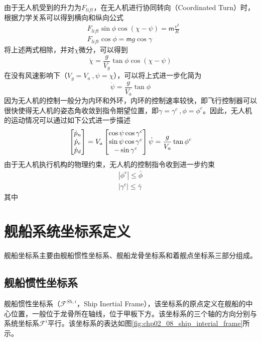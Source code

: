 由于无人机受到的升力为$F_{lift}$，在无人机进行协同转向（Coordinated Turn）时，根据力学关系可以得到横向和纵向公式
\begin{align}
&F_{lift} \sin \phi \cos (\chi - \psi) = \mathsf{m} \frac{v^2}{R}  \\
&F_{lift } \cos \phi = \mathsf{m} g \cos \gamma
\end{align}
将上述两式相除，并对$\chi$微分，可以得到
\begin{equation}
\dot{\chi} = \frac{g}{V_g} \tan \phi \cos (\chi - \psi)
\end{equation}
在没有风速影响下（$V_g = V_a\ , \psi = \chi$），可以将上式进一步化简为
\begin{equation}
\dot{\psi} =\frac{g}{V_a} \tan \phi
\end{equation}
因为无人机的控制一般分为内环和外环，内环的控制速率较快，即飞行控制器可以很快使得无人机的姿态角收敛到指令期望位置，即$\gamma = \gamma^c\ , \phi = \phi^c$。因此，无人机的运动情况可以通过如下公式进一步描述
\begin{equation}
\begin{bmatrix} \dot{p}_n \\\dot{p}_e \\ \dot{p}_d \end{bmatrix}  = {V}_a \begin{bmatrix} \cos \psi \cos \gamma^c \\ \sin \psi \cos \gamma^c  \\- \sin \gamma^c \end{bmatrix} \\
\dot{\psi} =\frac{g}{V_a} \tan \phi^c
\end{equation}
由于无人机执行机构的物理约束，无人机的控制指令收到进一步约束
\begin{align}
|\phi^c| \le \bar{\phi} \\
|\gamma^c| \le \bar{\gamma}
\end{align}
其中


\section{舰船系统坐标系定义}

舰船坐标系主要由舰船惯性坐标系、舰船龙骨坐标系和着舰点坐标系三部分组成。
\subsection{舰船惯性坐标系}
舰船惯性坐标系（$\mathcal{F}^{Sh,i}$，Ship Inertial Frame），该坐标系的原点定义在舰船的中心位置，一般位于龙骨所在轴线，位于甲板下方。该坐标系的三个轴的方向分别与系统坐标系$\mathcal{F}^i$平行。该坐标系的表达如图\ref{fig:chp02_08_ship_interial_frame}所示。

